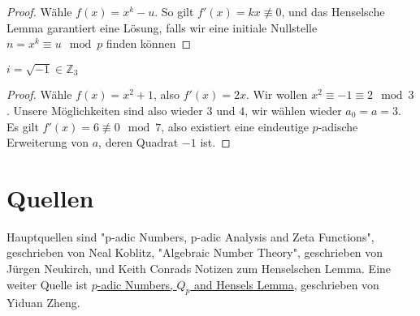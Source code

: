 \documentclass{report}
\newcommand{\bZ}{\mathbb{Z}}
\begin{document}
	\begin{proof}
		Wähle $f(x) = x^k - u$. So gilt $f'(x) = kx \not \equiv 0$, und das Henselsche Lemma garantiert eine Lösung, falls wir eine initiale Nullstelle $n = x^k \equiv u \mod p$ finden können
	\end{proof}
	\begin{application}
		$i = \sqrt{-1} \in \bZ_3$
	\end{application}
	\begin{proof}
		Wähle $f(x) = x^2 + 1$, also $f'(x) = 2x$. Wir wollen $x^2 \equiv -1 \equiv 2 \mod 3$. Unsere Möglichkeiten sind also wieder $3$ und $4$, wir wählen wieder $a_0 = a = 3$. Es gilt $f'(x) = 6 \not\equiv 0 \mod 7$, also existiert eine eindeutige $p$-adische Erweiterung von $a$, deren Quadrat $-1$ ist.
	\end{proof}
	\iffalse
	\section{Eine verallgemeinerte Version}
	Unsere erste Version des Henselschen Lemmas erlaubt uns nicht, Wurzeln mit Vielfachheiten größer als $1$ als die initiale Approximation zu verwenden. Wir beweisen nun eine allgemeinere Version, welche uns außerdem eine Abschätzung des $p$-adischen Abstands zwischen der Approximation und der exakten Lösung gibt:
	\begin{theorem}
		Sei 
		\begin{align*}
			F(x) = \sum_{i = 0}^n c_i x^i
		\end{align*}
		ein Polynom mit Koeffizienten $c_i \in \bZ_p$. Sei $F'(x)$ die Ableitung von $F(x)$, also
		\begin{align*}
			F'(x) = \sum_{i = 0}^{n-1} c_{i+1} x^i
		\end{align*}
		Sei außerdem $a_0 \in \bZ_p$, sodass:
		\begin{align*}
			\abs{F(a_0)}_p < \abs{F'(a_0)}_p^2 
		\end{align*}
		Dann existiert ein eindeutiges $a \in \bZ_p$, sodass:
		\begin{align*}
				F(a) &= 0\\
				\abs{a - a_0}_p & = \abs{\frac{F(a_0)}{F'(a_0)}}_p < \abs{F'(a)}_p\\
				\abs{F'(a)}_p &= \abs{F'(a_0)}_p
		\end{align*}
	\end{theorem}
	\fi
	\appendix
	\chapter{Quellen}
	Hauptquellen sind "p-adic Numbers, p-adic Analysis and Zeta Functions", geschrieben von Neal Koblitz, "Algebraic Number Theory", geschrieben von Jürgen Neukirch, und Keith Conrads Notizen zum Henselschen Lemma. Eine weiter Quelle ist \href{https://math.uchicago.edu/~may/REU2020/REUPapers/Zheng,Yiduan.pdf}{$p$-adic Numbers, $Q_p$ and Hensels Lemma}, geschrieben von Yiduan Zheng.
\end{document}

